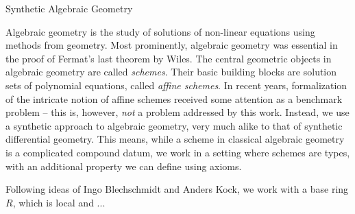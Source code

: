 \documentclass{../zariski}
\begin{document}
\begin{center}
  \LARGE{Synthetic Algebraic Geometry}
\end{center}

Algebraic geometry is the study of solutions of non-linear equations using methods from geometry.
Most prominently, algebraic geometry was essential in the proof of Fermat's last theorem by Wiles.
The central geometric objects in algebraic geometry are called \emph{schemes}.
Their basic building blocks are solution sets of polynomial equations, called \emph{affine schemes}.
In recent years,
formalization of the intricate notion of affine schemes
received some attention as a benchmark problem
-- this is, however, \emph{not} a problem addressed by this work.
Instead, we use a synthetic approach to algebraic geometry,
very much alike to that of synthetic differential geometry.
This means, while a scheme in classical algebraic geometry is a complicated compound datum,
we work in a setting where schemes are types,
with an additional property we can define using axioms.

Following ideas of Ingo Blechschmidt and Anders Kock,
we work with a base ring $R$, which is local and ...

\end{document}
